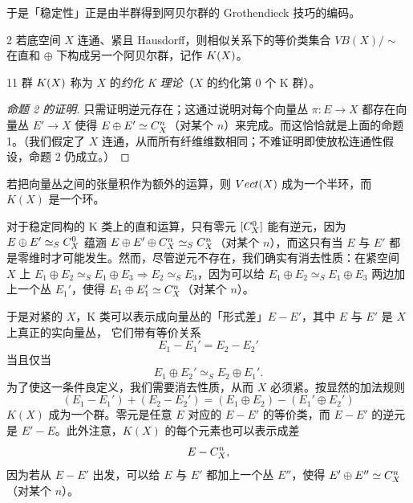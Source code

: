 
于是「稳定性」正是由半群得到阿贝尔群的 Grothendieck 技巧的编码。

\begin{prop}{2}
若底空间 $X$ 连通、紧且 Hausdorff，则相似关系下的等价类集合 $VB(X)/\sim$ 在直和 $\oplus$ 下构成另一个阿贝尔群，记作 $ K(X)$。
\end{prop}

\begin{defn}{11}
群 $ K(X)$ 称为 $X$ 的\emph{约化 K 理论}（$X$ 的约化第 0 个 K 群）。
\end{defn}

\begin{proof}[命题 2 的证明]
只需证明逆元存在；这通过说明对每个向量丛 $\pi: E\to X$ 都存在向量丛 $E'\to X$ 使得 $E\oplus E'\simeq C^n_X$（对某个 $n$）来完成。而这恰恰就是上面的命题 1。（我们假定了 $X$ 连通，从而所有纤维维数相同；不难证明即使放松连通性假设，命题 2 仍成立。）
\end{proof}


若把向量丛之间的张量积作为额外的运算，则 $Vect(X)$ 成为一个半环，而 $K(X)$ 是一个环。

对于稳定同构的 K 类上的直和运算，只有零元 $[C^0_X]$ 能有逆元，因为 $E\oplus E'\simeq_SC^0_X$ 蕴涵 $E\oplus E'\oplus C^n_X\simeq_SC^n_X$（对某个 $n$），而这只有当 $E$ 与 $E'$ 都是零维时才可能发生。然而，尽管逆元不存在，我们确实有消去性质：在紧空间 $X$ 上 $E_1\oplus E_2\simeq_S E_1\oplus E_3\Rightarrow E_2\simeq_S E_3$，因为可以给 $E_1\oplus E_2\simeq_S E_1\oplus E_3$ 两边加上一个丛 $E_1'$，使得 $E_1\oplus E_1'\simeq C^n_X$（对某个 $n$）。

于是对紧的 $X$，K 类可以表示成向量丛的「形式差」$E-E'$，其中 $E$ 与 $E'$ 是 $X$ 上真正的实向量丛，
它们带有等价关系
\[ E_1-E_1'=E_2-E_2' \]
当且仅当
\[ E_1\oplus E_2'\simeq_S E_2\oplus E_1'. \]
为了使这一条件良定义，我们需要消去性质，从而 $X$ 必须紧。按显然的加法规则
\[ (E_1-E_1')+(E_2-E_2')=(E_1\oplus E_2)-(E_1'\oplus E_2') \]
$K(X)$ 成为一个群。零元是任意 $E$ 对应的 $E-E'$ 的等价类，而 $E-E'$ 的逆元是 $E'-E$。此外注意，$K(X)$ 的每个元素也可以表示成差
\[ E-C^n_X, \]
因为若从 $E-E'$ 出发，可以给 $E$ 与 $E'$ 都加上一个丛 $E''$，使得 $E'\oplus E''\simeq C^n_X$（对某个 $n$）。

